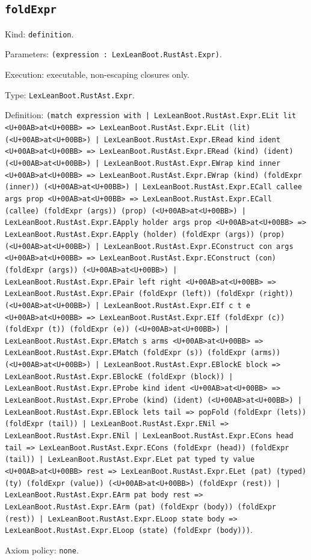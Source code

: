 \documentclass[11pt]{article}
\begin{document}
\subsection*{\texttt{foldExpr}}
\noindent Kind: \texttt{definition}.\par
\noindent Parameters: \texttt{(expression : LexLeanBoot.RustAst.Expr)}.\par
\noindent Execution: executable, non-escaping closures only.\par
\noindent Type: \texttt{LexLeanBoot.RustAst.Expr}.\par
\noindent Definition: \texttt{(match expression with | LexLeanBoot.RustAst.Expr.ELit lit <U+00AB>at<U+00BB> => LexLeanBoot.RustAst.Expr.ELit (lit) (<U+00AB>at<U+00BB>) | LexLeanBoot.RustAst.Expr.ERead kind ident <U+00AB>at<U+00BB> => LexLeanBoot.RustAst.Expr.ERead (kind) (ident) (<U+00AB>at<U+00BB>) | LexLeanBoot.RustAst.Expr.EWrap kind inner <U+00AB>at<U+00BB> => LexLeanBoot.RustAst.Expr.EWrap (kind) (foldExpr (inner)) (<U+00AB>at<U+00BB>) | LexLeanBoot.RustAst.Expr.ECall callee args prop <U+00AB>at<U+00BB> => LexLeanBoot.RustAst.Expr.ECall (callee) (foldExpr (args)) (prop) (<U+00AB>at<U+00BB>) | LexLeanBoot.RustAst.Expr.EApply holder args prop <U+00AB>at<U+00BB> => LexLeanBoot.RustAst.Expr.EApply (holder) (foldExpr (args)) (prop) (<U+00AB>at<U+00BB>) | LexLeanBoot.RustAst.Expr.EConstruct con args <U+00AB>at<U+00BB> => LexLeanBoot.RustAst.Expr.EConstruct (con) (foldExpr (args)) (<U+00AB>at<U+00BB>) | LexLeanBoot.RustAst.Expr.EPair left right <U+00AB>at<U+00BB> => LexLeanBoot.RustAst.Expr.EPair (foldExpr (left)) (foldExpr (right)) (<U+00AB>at<U+00BB>) | LexLeanBoot.RustAst.Expr.EIf c t e <U+00AB>at<U+00BB> => LexLeanBoot.RustAst.Expr.EIf (foldExpr (c)) (foldExpr (t)) (foldExpr (e)) (<U+00AB>at<U+00BB>) | LexLeanBoot.RustAst.Expr.EMatch s arms <U+00AB>at<U+00BB> => LexLeanBoot.RustAst.Expr.EMatch (foldExpr (s)) (foldExpr (arms)) (<U+00AB>at<U+00BB>) | LexLeanBoot.RustAst.Expr.EBlockE block => LexLeanBoot.RustAst.Expr.EBlockE (foldExpr (block)) | LexLeanBoot.RustAst.Expr.EProbe kind ident <U+00AB>at<U+00BB> => LexLeanBoot.RustAst.Expr.EProbe (kind) (ident) (<U+00AB>at<U+00BB>) | LexLeanBoot.RustAst.Expr.EBlock lets tail => popFold (foldExpr (lets)) (foldExpr (tail)) | LexLeanBoot.RustAst.Expr.ENil => LexLeanBoot.RustAst.Expr.ENil | LexLeanBoot.RustAst.Expr.ECons head tail => LexLeanBoot.RustAst.Expr.ECons (foldExpr (head)) (foldExpr (tail)) | LexLeanBoot.RustAst.Expr.ELet pat typed ty value <U+00AB>at<U+00BB> rest => LexLeanBoot.RustAst.Expr.ELet (pat) (typed) (ty) (foldExpr (value)) (<U+00AB>at<U+00BB>) (foldExpr (rest)) | LexLeanBoot.RustAst.Expr.EArm pat body rest => LexLeanBoot.RustAst.Expr.EArm (pat) (foldExpr (body)) (foldExpr (rest)) | LexLeanBoot.RustAst.Expr.ELoop state body => LexLeanBoot.RustAst.Expr.ELoop (state) (foldExpr (body)))}.\par
\noindent Axiom policy: \texttt{none}.\par
\end{document}
